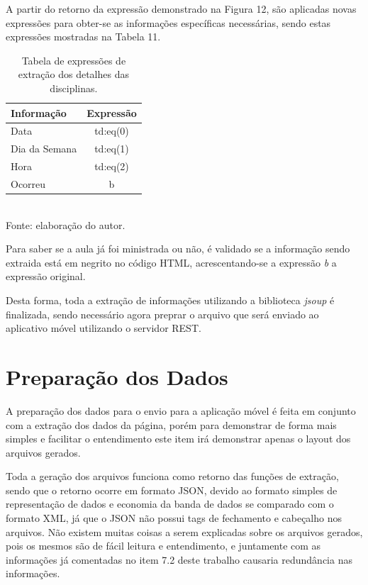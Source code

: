 
A partir do retorno da expressão demonstrado na Figura 12, são aplicadas novas expressões para obter-se as informações específicas necessárias, sendo estas expressões mostradas na Tabela 11.

\begin{table}[!hbt]
\centering
\caption[Extração de Informações - Expressões de Extração dos Detalhes da Disciplina]{Tabela de expressões de extração dos detalhes das disciplinas.}
\vspace{3mm}
\begin{tabular}{p{3cm}|c}\hline
\bf{Informação} & \bf{Expressão}                                 \\ \hline
Data            & td:eq(0) \\ \hline
Dia da Semana   & td:eq(1) \\ \hline
Hora            & td:eq(2) \\ \hline
Ocorreu         & b        \\ \hline
\end{tabular}
\\ Fonte: elaboração do autor.
\end{table}

Para saber se a aula já foi ministrada ou não, é validado se a informação sendo extraida está em negrito no código HTML, acrescentando-se a expressão \emph{b} a expressão original.

Desta forma, toda a extração de informações utilizando a biblioteca \emph{jsoup} é finalizada, sendo necessário agora preprar o arquivo que será enviado ao aplicativo móvel utilizando o servidor REST.

\section{Preparação dos Dados}
A preparação dos dados para o envio para a aplicação móvel é feita em conjunto com a extração dos dados da página, porém para demonstrar de forma mais simples e facilitar o entendimento este item irá demonstrar apenas o layout dos arquivos gerados. 

Toda a geração dos arquivos funciona como retorno das funções de extração, sendo que o retorno ocorre em formato JSON, devido ao formato simples de representação de dados e economia da banda de dados se comparado com o formato XML, já que o JSON não possui tags de fechamento e cabeçalho nos arquivos. Não existem muitas coisas a serem explicadas sobre os arquivos gerados, pois os mesmos são de fácil leitura e entendimento, e juntamente com as informações já comentadas no item 7.2 deste trabalho causaria redundância nas informações.

